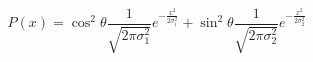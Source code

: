 \documentclass{article}
\begin{document}
\begin{equation}
  P(x)=\cos^2\theta \frac{1}{\sqrt{2\pi\sigma_1^2}}e^{-\frac{x^2}{2\sigma_1^2}}+\sin^2\theta \frac{1}{\sqrt{2\pi\sigma_2^2}}e^{-\frac{x^2}{2\sigma_2^2}}
\end{equation}
\end{document}
